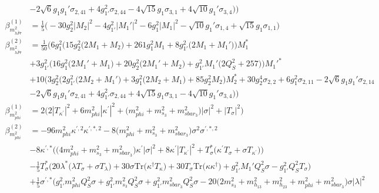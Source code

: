 {\begin{align}
 &-2 \sqrt{6} g_1 g_1' \sigma_{2,41} +4 g_{1'}^{2} \sigma_{2,44} -4 \sqrt{15} g_1 \sigma_{3,1} +4 \sqrt{10} g_1' \sigma_{3,4} \Big)\Big)\\ 
\beta_{m_{\bar{hPr}}^2}^{(1)} & =  
\frac{1}{5} \Big(-30 g_{2}^{2} |M_2|^2  -4 g_{1'}^{2} |M_1'|^2  -6 g_{1}^{2} |M_1|^2  - \sqrt{10} g_1' \sigma_{1,4}  + \sqrt{15} g_1 \sigma_{1,1} \Big)\\ 
\beta_{m_{\bar{hPr}}^2}^{(2)} & =  
\frac{1}{50} \Big(6 g_{1}^{2} \Big(15 g_{2}^{2} \Big(2 M_1  + M_2\Big) + 261 g_{1}^{2} M_1  + 8 g_{1'}^{2} \Big(2 M_1  + M_1'\Big)\Big)M_1^* \nonumber \\ 
 &+3 g_{1'}^{2} \Big(16 g_{1}^{2} \Big(2 M_1'  + M_1\Big) + 20 g_{2}^{2} \Big(2 M_1'  + M_2\Big) + g_{1'}^{2} M_1' \Big(2 Q_{S}^{2}  + 257\Big)\Big)M_1'^* \nonumber \\ 
 &+10 \Big(3 g_{2}^{2} \Big(2 g_{1'}^{2} \Big(2 M_2  + M_1'\Big) + 3 g_{1}^{2} \Big(2 M_2  + M_1\Big) + 85 g_{2}^{2} M_2 \Big)M_2^* +30 g_{2}^{4} \sigma_{2,2} +6 g_{1}^{2} \sigma_{2,11} -2 \sqrt{6} g_1 g_1' \sigma_{2,14} \nonumber \\ 
 &-2 \sqrt{6} g_1 g_1' \sigma_{2,41} +4 g_{1'}^{2} \sigma_{2,44} +4 \sqrt{15} g_1 \sigma_{3,1} -4 \sqrt{10} g_1' \sigma_{3,4} \Big)\Big)\\ 
\beta_{m_{phi}^2}^{(1)} & =  
2 \Big(2 |T_{\kappa^\prime}|^2  + 6 m_{phi}^2 |\kappa^\prime|^2  + \Big(m_{phi}^2 + m_{s_3}^2 + m_{sbar_3}^2\Big)|\sigma|^2  + |T_{\sigma}|^2\Big)\\ 
\beta_{m_{phi}^2}^{(2)} & =  
-96 m_{phi}^2 \kappa^{\prime,2} \kappa^{\prime,*,2} -8 \Big(m_{phi}^2 + m_{s_3}^2 + m_{sbar_3}^2\Big)\sigma^{2} \sigma^{\prime,*,2} \nonumber \\ 
 &-8 \kappa^{\prime,*} \Big(\Big(4 m_{phi}^2  + m_{s_3}^2 + m_{sbar_3}^2\Big)\kappa^\prime |\sigma|^2  + 8 \kappa^\prime |T_{\kappa^\prime}|^2  + T_{\sigma}^* \Big(\kappa^\prime T_{\sigma}  + \sigma T_{\kappa^\prime} \Big)\Big)\nonumber \\ 
 &-\frac{1}{5} T_{\sigma}^* \Big(20 \lambda^* \Big(\lambda T_{\sigma}  + \sigma T_{\lambda} \Big) + 30 \sigma \mbox{Tr}\Big({\kappa^{\dagger}  T_{\kappa}}\Big)  + 30 T_{\sigma} \mbox{Tr}\Big({\kappa  \kappa^{\dagger}}\Big)  + g_{1'}^{2} M_1' Q_{S}^{2} \sigma  - g_{1'}^{2} Q_{S}^{2} T_{\sigma} \Big)\nonumber \\ 
 &+\frac{1}{5} \sigma^{\prime,*} \Big(g_{1'}^{2} m_{phi}^2 Q_{S}^{2} \sigma +g_{1'}^{2} m_{s_3}^2 Q_{S}^{2} \sigma +g_{1'}^{2} m_{sbar_3}^2 Q_{S}^{2} \sigma -20 \Big(2 m_{s_3}^2  + m_{h_{13}}^2 + m_{h_{23}}^2 + m_{phi}^2 + m_{sbar_3}^2\Big)\sigma |\lambda|^2 \nonumber \\ 

\end{align}}
